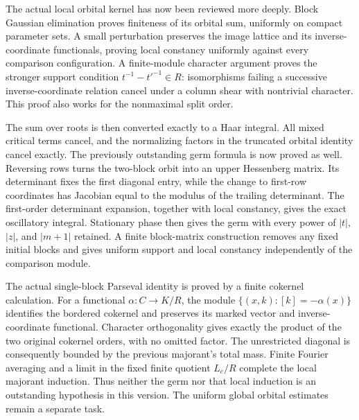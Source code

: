 \documentclass[11pt,a4paper]{article}
\theoremstyle{remark}
\begin{document}
The actual local orbital kernel has now been reviewed more deeply.
Block Gaussian elimination proves finiteness of its orbital sum,
uniformly on compact parameter sets. A small perturbation preserves
the image lattice and its inverse-coordinate functionals, proving
local constancy uniformly against every comparison configuration.
A finite-module character argument proves the stronger support
condition $t^{-1}-t'^{-1}\in R$: isomorphisms failing a successive
inverse-coordinate relation cancel under a column shear with
nontrivial character. This proof also works for the nonmaximal
split order.

The sum over roots is then converted exactly to a Haar integral.
All mixed critical terms cancel, and the normalizing factors in
the truncated orbital identity cancel exactly. The previously
outstanding germ formula is now proved as well. Reversing rows
turns the two-block orbit into an upper Hessenberg matrix.
Its determinant fixes the first diagonal entry, while the change
to first-row coordinates has Jacobian equal to the modulus of
the trailing determinant. The first-order determinant expansion,
together with local constancy, gives the exact oscillatory integral.
Stationary phase then gives the germ with every power of $|t|$,
$|z|$, and $|m+1|$ retained. A finite block-matrix construction
removes any fixed initial blocks and gives uniform support and
local constancy independently of the comparison module.

The actual single-block Parseval identity is proved by a finite
cokernel calculation. For a functional $\alpha:C\to K/R$, the
module $\{(x,k):[k]=-\alpha(x)\}$ identifies the bordered
cokernel and preserves its marked vector and inverse-coordinate
functional. Character orthogonality gives exactly the product
of the two original cokernel orders, with no omitted factor.
The unrestricted diagonal is consequently bounded by the previous
majorant's total mass. Finite Fourier averaging and a limit in
the fixed finite quotient $L_c/R$ complete the local majorant
induction. Thus neither the germ nor that local induction is
an outstanding hypothesis in this version. The uniform global
orbital estimates remain a separate task.
\end{document}
